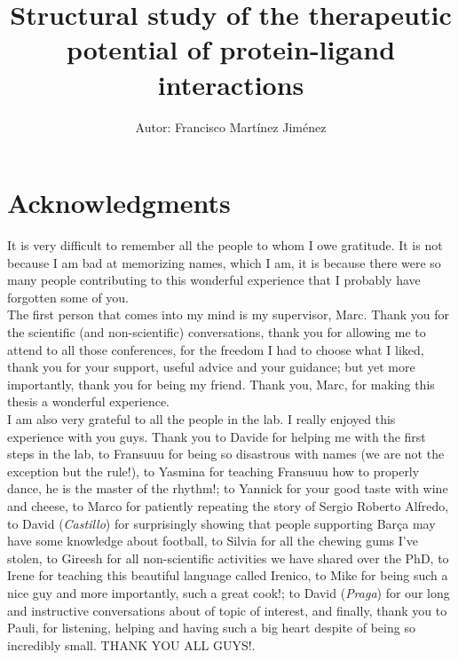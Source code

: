 \documentclass[11pt, b5paper,twoside]{tesi_upf}
\title{Structural study of the therapeutic potential of protein-ligand interactions}
\author{Autor: Francisco Mart\'inez Jim\'enez}
\begin{document}
\sloppy
\captionsetup[table]{skip=20pt}
\captionsetup[longtable]{skip=20pt}
\frontmatter
{}

\maketitle
\thispagestyle{empty}
\cleardoublepage
\thispagestyle{empty}



\clearpage
\section*{Acknowledgments}
\setcounter{page}{1}

It is very difficult to remember all the people to whom I owe gratitude. It is not because I am bad at memorizing names, which I am, it is because there were so many people contributing to this wonderful experience that I probably have forgotten some of you.\\ 
The first person that comes into my mind is my supervisor, Marc. Thank you for the scientific (and non-scientific) conversations, thank you for allowing me to attend to all those conferences,  for the freedom I had to choose what I liked, thank you for your support, useful advice and your guidance;  but yet more importantly, thank you for being my friend. Thank you, Marc, for making this thesis a wonderful experience.\\  
I am also very grateful to all the people in the lab. I really enjoyed this experience with you guys. Thank you to Davide for helping me with the first steps in the lab, to Fransuuu for being so disastrous with names (we are not the exception but the rule!), to Yasmina for teaching Fransuuu how to properly dance, he is the master of the rhythm!; to Yannick for your good taste with wine and cheese, to Marco for patiently repeating the story of Sergio Roberto Alfredo, to David (\textit{Castillo}) for surprisingly showing that people supporting Barça may have some knowledge about football, to Silvia for all the chewing gums I've stolen, to Gireesh for all non-scientific activities we have shared over the PhD, to Irene for teaching this beautiful language called Irenico, to Mike for being such a nice guy and more importantly, such a great cook!; to David  (\textit{Praga}) for our long and instructive conversations about of topic of interest, and finally, thank you to Pauli, for listening, helping and having such a big heart despite of being so incredibly small. THANK YOU ALL GUYS!. \\
\end{document}
